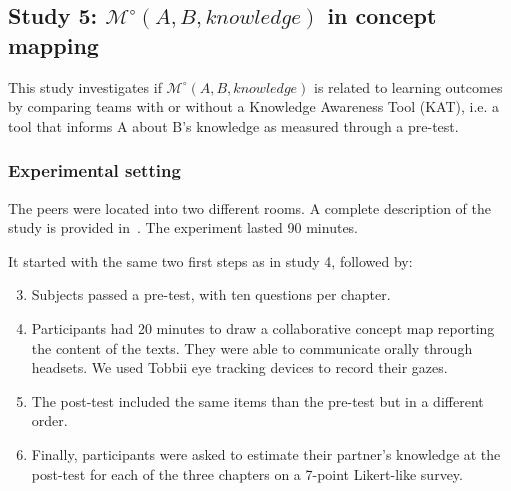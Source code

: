 \documentclass[natbib]{svjour3}
\newcommand{\ie}{i.e.\xspace}
\newcommand{\A}{A\xspace}
\newcommand{\B}{B\xspace}
\newcommand{\Model}[3]{{$\mathcal{M}^{\circ}(#1, #2, #3)$}}
\begin{document}
\subsection{{\bf Study 5}: \Model{A}{B}{knowledge} in concept mapping}

This study investigates if \Model{A}{B}{knowledge} is related to learning
outcomes by comparing teams with or without a Knowledge Awareness Tool (KAT),
\ie a tool that informs \A about \B's knowledge as measured through a pre-test.

\subsubsection*{Experimental setting}

The peers were located into two different rooms. A complete description of the
study is provided in~\citet{sangin2008learners}. The experiment lasted 90 minutes.

It started with the same two first steps as in study 4, followed by:

\begin{enumerate}
    \setcounter{enumi}{2}

    \item Subjects passed a pre-test, with ten questions per chapter. 

    \item Participants had 20 minutes to draw a collaborative concept map
        reporting the content of the texts. They were able to communicate
        orally through headsets.  We used Tobbii eye tracking devices to
        record their gazes.

    \item The post-test included the same items than the pre-test but in a
        different order. 

    \item  Finally, participants were asked to estimate their partner's
        knowledge at the post-test for each of the three chapters on a 7-point
        Likert-like survey. 

\end{enumerate}
\end{document}

